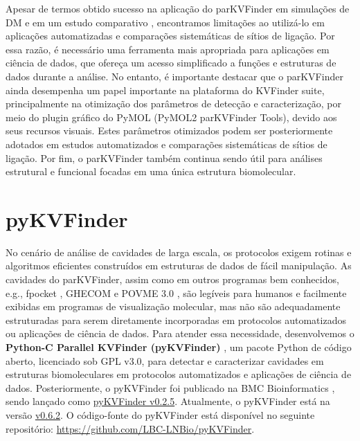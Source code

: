 \documentclass[Portugues]{phdquali}
\def\eg{e.g.\onedot}
\begin{document}
Apesar de termos obtido sucesso na aplicação do parKVFinder em simulações de DM \cite{guerra2020} e em um estudo comparativo \cite{ribeiro2021}, encontramos limitações ao utilizá-lo em aplicações automatizadas e comparações sistemáticas de sítios de ligação. Por essa razão, é necessário uma ferramenta mais apropriada para aplicações em ciência de dados, que ofereça um acesso simplificado a funções e estruturas de dados durante a análise. No entanto, é importante destacar que o parKVFinder ainda desempenha um papel importante na plataforma do KVFinder suite, principalmente na otimização dos parâmetros de detecção e caracterização, por meio do plugin gráfico do PyMOL (PyMOL2 parKVFinder Tools), devido aos seus recursos visuais. Estes parâmetros otimizados podem ser posteriormente adotados em estudos automatizados e comparações sistemáticas de sítios de ligação. Por fim, o parKVFinder também continua sendo útil para análises estrutural e funcional focadas em uma única estrutura biomolecular.


\section{pyKVFinder}

No cenário de análise de cavidades de larga escala, os protocolos exigem rotinas e algoritmos eficientes construídos em estruturas de dados de fácil manipulação. As cavidades do parKVFinder, assim como em outros programas bem conhecidos, \eg, fpocket \cite{fpocket}, GHECOM \cite{ghecom} e POVME 3.0 \cite{povme}, são legíveis para humanos e facilmente exibidas em programas de visualização molecular, mas não são adequadamente estruturadas para serem diretamente incorporadas em protocolos automatizados ou aplicações de ciência de dados. Para atender essa necessidade, desenvolvemos o \textbf{Python-C Parallel KVFinder (pyKVFinder)} \cite{guerra2021}, um pacote Python de código aberto, licenciado sob GPL v3.0, para detectar e caracterizar cavidades em estruturas biomoleculares em protocolos automatizados e aplicações de ciência de dados. Posteriormente, o pyKVFinder foi publicado na BMC Bioinformatics \cite{guerra2021}, sendo lançado como \href{https://github.com/LBC-LNBio/pyKVFinder/tree/v0.2.5}{pyKVFinder v0.2.5}. Atualmente, o pyKVFinder está na versão \href{https://github.com/LBC-LNBio/pyKVFinder/tree/v0.6.2}{v0.6.2}. O código-fonte do pyKVFinder está disponível no seguinte repositório: \url{https://github.com/LBC-LNBio/pyKVFinder}.
\end{document}
